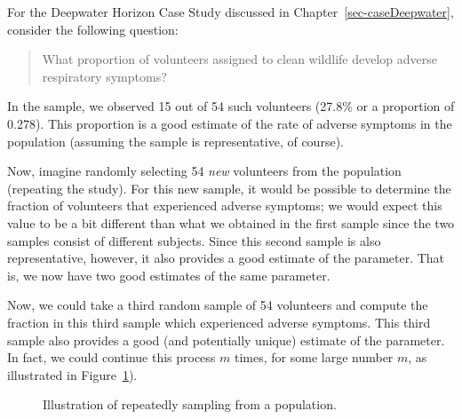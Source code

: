 \documentclass[
  letterpaper,
  DIV=11,
  numbers=noendperiod]{scrreprt}
\theoremstyle{plain}
\theoremstyle{definition}
\theoremstyle{definition}
\theoremstyle{remark}
\begin{document}
For the Deepwater Horizon Case Study discussed in
Chapter~\ref{sec-caseDeepwater}, consider the following question:

\begin{quote}
What proportion of volunteers assigned to clean wildlife develop adverse
respiratory symptoms?
\end{quote}

In the sample, we observed 15 out of 54 such volunteers (27.8\% or a
proportion of 0.278). This proportion is a good estimate of the rate of
adverse symptoms in the population (assuming the sample is
representative, of course).

Now, imagine randomly selecting 54 \emph{new} volunteers from the
population (repeating the study). For this new sample, it would be
possible to determine the fraction of volunteers that experienced
adverse symptoms; we would expect this value to be a bit different than
what we obtained in the first sample since the two samples consist of
different subjects. Since this second sample is also representative,
however, it also provides a good estimate of the parameter. That is, we
now have two good estimates of the same parameter.

Now, we could take a third random sample of 54 volunteers and compute
the fraction in this third sample which experienced adverse symptoms.
This third sample also provides a good (and potentially unique) estimate
of the parameter. In fact, we could continue this process \(m\) times,
for some large number \(m\), as illustrated in
Figure~\ref{fig-samplingdistns-sampling-distribution}).

\begin{figure}


\caption{\label{fig-samplingdistns-sampling-distribution}Illustration of
repeatedly sampling from a population.}

\end{figure}%
\end{document}
